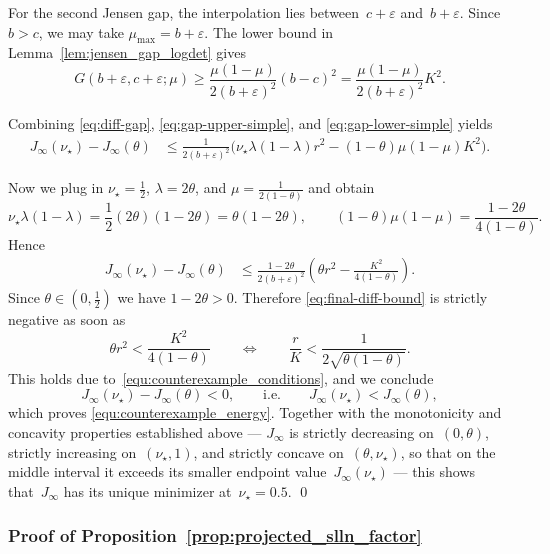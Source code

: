 \documentclass[10pt, letterpaper]{amsart}
\begin{document}
For the second Jensen gap, the interpolation lies between~$c+\varepsilon$ and~$b+\varepsilon$. Since~$b>c$, we may take $\mu_{\max}=b+\varepsilon$. The lower bound in Lemma~\ref{lem:jensen_gap_logdet} gives
\begin{equation}\label{eq:gap-lower-simple}
G(b+\varepsilon,c+\varepsilon;\mu)
\geq
\frac{\mu(1-\mu)}{2(b+\varepsilon)^2}(b-c)^2
=
\frac{\mu(1-\mu)}{2(b+\varepsilon)^2}K^2.
\end{equation}

Combining \eqref{eq:diff-gap}, \eqref{eq:gap-upper-simple}, and \eqref{eq:gap-lower-simple} yields
\begin{align*}
J_\infty(\nu_\star)-J_\infty(\theta)
&\le \frac{1}{2(b+\varepsilon)^2}\Big(\nu_\star\lambda(1-\lambda)r^2-(1-\theta)\mu(1-\mu)K^2\Big).
\end{align*}

Now we plug in $\nu_\star=\tfrac12$, $\lambda=2\theta$, and $\mu=\frac{1}{2(1-\theta)}$ and obtain
\[
\nu_\star\lambda(1-\lambda)=\frac12 (2\theta)(1-2\theta)=\theta(1-2\theta),
\qquad
(1-\theta)\mu(1-\mu)
=\frac{1-2\theta}{4(1-\theta)}.
\]
Hence
\begin{align}
J_\infty(\nu_\star)-J_\infty(\theta)
&\le \frac{1-2\theta}{2(b+\varepsilon)^2}
\left(\theta r^2-\frac{K^2}{4(1-\theta)}\right).\label{eq:final-diff-bound}
\end{align}
Since $\theta\in(0,\tfrac12)$ we have $1-2\theta>0$. Therefore \eqref{eq:final-diff-bound} is strictly negative as soon as
\[
\theta r^2<\frac{K^2}{4(1-\theta)}
\qquad\Longleftrightarrow\qquad
\frac{r}{K}<\frac{1}{2\sqrt{\theta(1-\theta)}}.
\]
This holds due to~\eqref{equ:counterexample_conditions}, and we conclude
\[
J_\infty(\nu_\star)-J_\infty(\theta)<0,
\qquad\text{i.e.}\qquad
J_\infty(\nu_\star)<J_\infty(\theta),
\]
which proves \eqref{equ:counterexample_energy}.
Together with the monotonicity and concavity properties established above --- $J_\infty$ is strictly decreasing on~$(0,\theta)$, strictly increasing on~$(\nu_\star,1)$, and strictly concave on~$(\theta,\nu_\star)$, so that on the middle interval it exceeds its smaller endpoint value~$J_\infty(\nu_\star)$ --- this shows that~$J_\infty$ has its unique minimizer at~$\nu_\star=0.5$. \qed

\subsubsection{Proof of Proposition~\ref{prop:projected_slln_factor}}\label{sec:proof_qml_consistency_factor}
\end{document}
